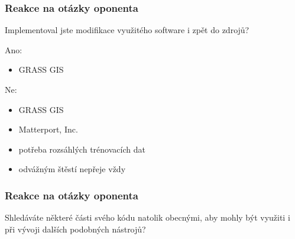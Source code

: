 \documentclass{beamer}
\begin{document}

\begin{frame}

\frametitle{Reakce na otázky oponenta}

Implementoval jste modifikace využitého software i zpět do zdrojů?

\begin{center}
	\noindent\makebox[\linewidth]{\rule{0.9\textwidth}{0.4pt}}
\end{center}

\bigskip

Ano:
\begin{itemize}
	\item<2-> GRASS GIS
\end{itemize}

Ne:
\begin{itemize}
	\item<3-> GRASS GIS
	\item<4-> Matterport, Inc.
	\item<7-> potřeba rozsáhlých trénovacích dat
	\item<8-> odvážným štěstí nepřeje vždy
\end{itemize}

\end{frame}


\begin{frame}

\frametitle{Reakce na otázky oponenta}

Shledáváte některé části svého kódu natolik obecnými, aby mohly být využiti i při vývoji dalších podobných nástrojů?

\begin{center}
	\noindent\makebox[\linewidth]{\rule{0.9\textwidth}{0.4pt}}
\end{center}

\bigskip


\end{frame}

\end{document}
